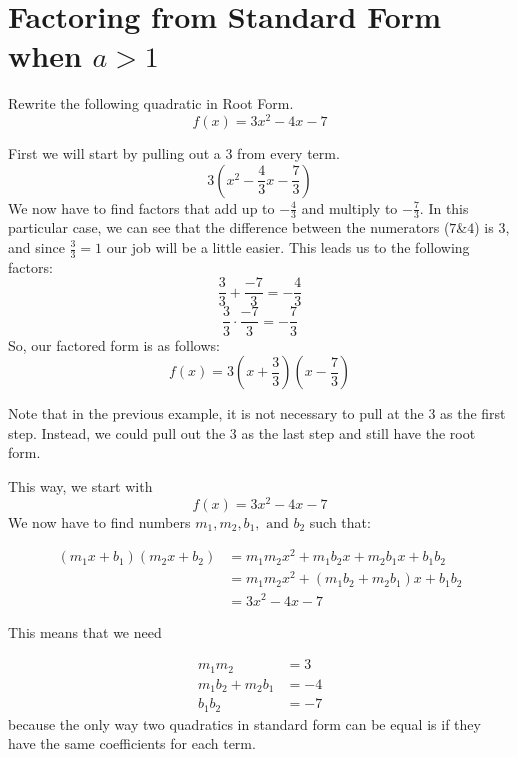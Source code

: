 \documentclass{ximera}
\begin{document}
\section{Factoring from Standard Form when $a>1$}
\begin{example}
Rewrite the following quadratic in Root Form.
\[
f(x)= 3x^2-4x-7
\]
\begin{explanation}
First we will start by pulling out a $3$ from every term.
\[
3\left(x^2-\frac{4}{3}x-\frac{7}{3}\right)
\]
We now have to find factors that add up to $-\frac{4}{3}$ and multiply to $-\frac{7}{3}$. In this particular case, we can see that the difference between the numerators ($7$\&$4$) is $3$, and since $\frac{3}{3}=1$ our job will be a little easier. This leads us to the following factors:
\[
\frac{3}{3}+\frac{-7}{3}=-\frac{4}{3}
\]
\[
\frac{3}{3}\cdot \frac{-7}{3}= -\frac{7}{3}
\]
So, our factored form is as follows:
\[
f(x) = 3\left(x+\frac{3}{3}\right)\left(x-\frac{7}{3}\right)
\]
\end{explanation}

Note that in the previous example, it is not necessary to pull at the $3$ as the first step.  Instead, we could pull out the $3$ as the last step and still have the root form.

\begin{explanation}
This way, we start with
\[
f(x)= 3x^2-4x-7
\]
We now have to find numbers $m_1,m_2,b_1, \text{ and } b_2$ such that:

\begin{align*}
(m_1x+b_1)(m_2x+b_2)&=m_1m_2x^2+m_1b_2x+m_2b_1x+b_1b_2\\
				&=m_1m_2x^2+(m_1b_2+m_2b_1)x+b_1b_2\\
				&= 3x^2-4x-7
\end{align*}

This means that we need

\begin{align*}
m_1m_2&=3\\
m_1b_2+m_2b_1&=-4\\
b_1b_2&=-7
\end{align*}
because the only way two quadratics in standard form can be equal is if they have the same coefficients for each term.


\end{explanation}
\end{example}
\end{document}

